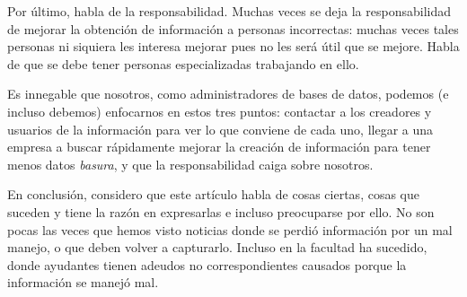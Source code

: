 \documentclass{article}
\begin{document}
Por último, habla de la responsabilidad. Muchas veces se deja la responsabilidad de mejorar
la obtención de información a personas incorrectas: muchas veces tales personas ni siquiera
les interesa mejorar pues no les será útil que se mejore. Habla de que se debe tener
personas especializadas trabajando en ello.

Es innegable que nosotros, como administradores de bases de datos, podemos (e incluso debemos)
enfocarnos en estos tres puntos: contactar a los creadores y usuarios de la información para
ver lo que conviene de cada uno, llegar a una empresa a buscar rápidamente mejorar la creación
de información para tener menos datos \textit{basura}, y que la responsabilidad caiga sobre
nosotros.

En conclusión, considero que este artículo habla de cosas ciertas, cosas que suceden y tiene
la razón en expresarlas e incluso preocuparse por ello. No son pocas las veces que hemos
visto noticias donde se perdió información por un mal manejo, o que deben volver a capturarlo.
Incluso en la facultad ha sucedido, donde ayudantes tienen adeudos no correspondientes
causados porque la información se manejó mal.
\end{document}
